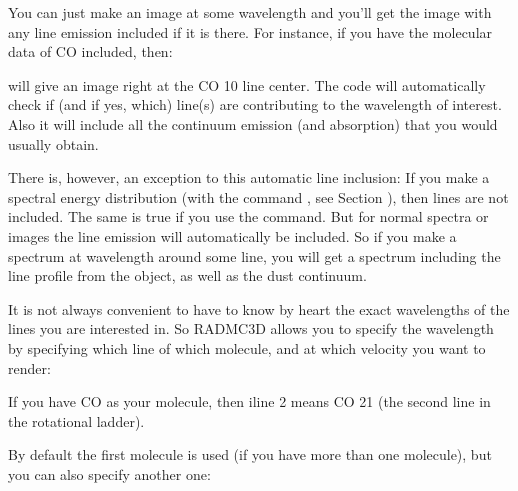 \documentclass[letterpaper,10pt,english]{sphinxmanual}
\begin{document}
You can just make an image at some wavelength and you’ll get the image with
any line emission included if it is there. For instance, if you have
the molecular data of CO included, then:

\begin{sphinxVerbatim}[commandchars=\\\{\}]
   
\end{sphinxVerbatim}

will give an image right at the CO 1\sphinxhyphen{}0 line center. The code will automatically
check if (and if yes, which) line(s) are contributing to the wavelength of
interest. Also it will include all the continuum emission (and absorption) that
you would usually obtain.

There is, however, an exception to this automatic line inclusion: If you make a
spectral energy distribution (with the command , see Section
{\hyperref[\detokenize{imagesspectra:sec-making-spectra}]{}}), then lines are not included. The same is true if you
use the  command.  But for normal spectra or images the line
emission will automatically be included.  So if you make a spectrum at
wavelength around some line, you will get a spectrum including the line profile
from the object, as well as the dust continuum.

It is not always convenient to have to know by heart the exact wavelengths
of the lines you are interested in. So RADMC\sphinxhyphen{}3D allows you to specify the
wavelength by specifying which line of which molecule, and at which velocity
you want to render:

\begin{sphinxVerbatim}[commandchars=\\\{\}]
     
\end{sphinxVerbatim}

If you have CO as your molecule, then iline 2 means CO 2\sphinxhyphen{}1 (the second
line in the rotational ladder).

By default the first molecule is used (if you have more than one molecule),
but you can also specify another one:

\begin{sphinxVerbatim}[commandchars=\\\{\}]
       
\end{sphinxVerbatim}
\end{document}
